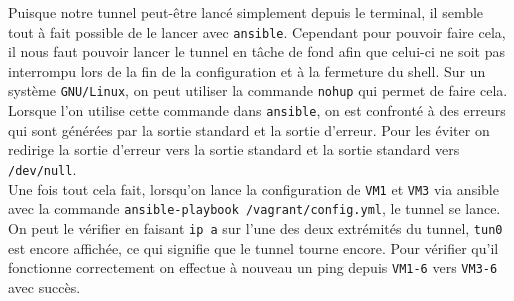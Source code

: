 \documentclass[a4paper, 12pt]{article}
\begin{document}
    Puisque notre tunnel peut-être lancé simplement depuis le terminal, il 
    semble tout à fait possible de le lancer avec \verb+ansible+. Cependant pour
    pouvoir faire cela, il nous faut pouvoir lancer le tunnel en tâche de fond 
    afin que celui-ci ne soit pas interrompu lors de la fin de la configuration
    et à la fermeture du shell. Sur un système \verb+GNU/Linux+, on peut 
    utiliser la commande \verb+nohup+ qui permet de faire cela. \\

    Lorsque l'on utilise cette commande dans \verb+ansible+, on est confronté à 
    des erreurs qui sont générées par la sortie standard et la sortie d'erreur.
    Pour les éviter on redirige la sortie d'erreur vers la sortie standard et 
    la sortie standard vers \verb+/dev/null+. \\

    Une fois tout cela fait, lorsqu'on lance la configuration de \verb+VM1+
    et \verb+VM3+ via ansible avec la commande \verb+ansible-playbook /vagrant/config.yml+, 
    le tunnel se lance. On peut le vérifier en faisant \verb+ip a+ sur l'une
    des deux extrémités du tunnel, \verb+tun0+ est encore affichée, ce qui 
    signifie que le tunnel tourne encore. Pour vérifier qu'il fonctionne 
    correctement on effectue à nouveau un ping depuis \verb+VM1-6+ vers 
    \verb+VM3-6+ avec succès.
\end{document}
